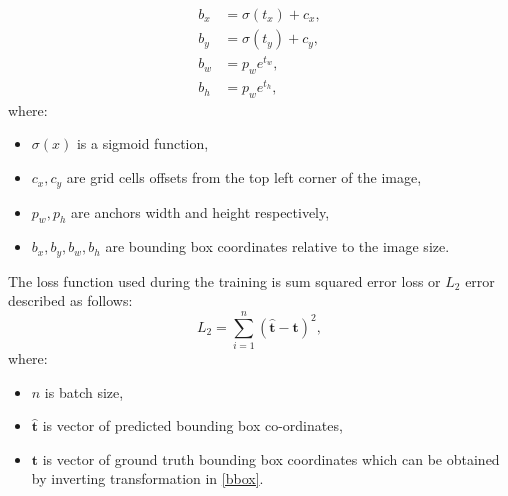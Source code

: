 \documentclass[twoside]{ctuthesis}
\theoremstyle{plain}
\theoremstyle{definition}
\theoremstyle{note}
\begin{document}
\begin{equation}\label{bbox}
	\begin{aligned}
		b_x&=\sigma(t_x)+c_x,\\
		b_y&=\sigma(t_y)+c_y,\\
		b_w&=p_{w}e^{t_w},\\
		b_h&=p_{w}e^{t_h},
	\end{aligned}
\end{equation}
where:
\begin{itemize}
	\item $\sigma(x)$ is a sigmoid function,
	\item $c_x, c_y$ are grid cells offsets from the top left corner of the image,
	\item $p_w, p_h$ are anchors width and height respectively,
	\item $b_x, b_y, b_w, b_h$ are bounding box coordinates relative to the image size.
\end{itemize}
The loss function used during the training is sum squared error loss or $L_2$ error described as follows:
\begin{equation}
	L_2=\sum_{i=1}^{n}(\mathbf{\hat{t}}-\mathbf{t})^2,
\end{equation}
where:
\begin{itemize}
	\item $n$ is batch size,
	\item $\mathbf{\hat{t}}$ is vector of predicted bounding box co-ordinates,
	\item $\mathbf{t}$ is vector of ground truth bounding box coordinates which can be obtained by inverting transformation in \eqref{bbox}.
\end{itemize}
\end{document}
